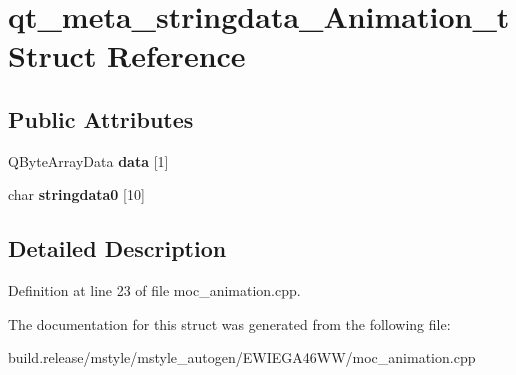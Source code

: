 \hypertarget{structqt__meta__stringdata___animation__t}{}\section{qt\+\_\+meta\+\_\+stringdata\+\_\+\+Animation\+\_\+t Struct Reference}
\label{structqt__meta__stringdata___animation__t}
\subsection*{Public Attributes}
\begin{DoxyCompactItemize}
\item 
\mbox{\label{structqt__meta__stringdata___animation__t_a6d3d4f8e04c65d35c556b58148469f58}} 
Q\+Byte\+Array\+Data {\bfseries data} \mbox{[}1\mbox{]}
\item 
\mbox{\label{structqt__meta__stringdata___animation__t_a74eb29b19d807cd37c2e815a9a75d14b}} 
char {\bfseries stringdata0} \mbox{[}10\mbox{]}
\end{DoxyCompactItemize}


\subsection{Detailed Description}


Definition at line 23 of file moc\+\_\+animation.\+cpp.



The documentation for this struct was generated from the following file\+:\begin{DoxyCompactItemize}
\item 
build.\+release/mstyle/mstyle\+\_\+autogen/\+E\+W\+I\+E\+G\+A46\+W\+W/moc\+\_\+animation.\+cpp\end{DoxyCompactItemize}
